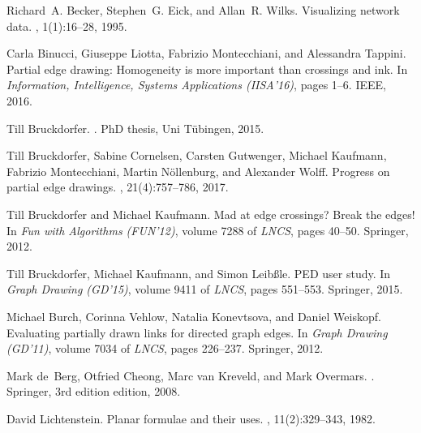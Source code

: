 \documentclass[a4paper,english,numberwithinsect]{eurocg18}
\begin{document}
%
\begin{thebibliography}{1}
	
	Richard~A. Becker, Stephen~G. Eick, and Allan~R. Wilks.
	\newblock Visualizing network data.
	, 1(1):16--28,
	1995.
	
	Carla Binucci, Giuseppe Liotta, Fabrizio Montecchiani, and Alessandra Tappini.
	\newblock Partial edge drawing: Homogeneity is more important than crossings
	and ink.
	\newblock In {\em Information, Intelligence, Systems Applications (IISA'16)},
	pages 1--6. IEEE, 2016.
	
	Till Bruckdorfer.
	.
	\newblock PhD thesis, Uni Tübingen, 2015.
	
	Till Bruckdorfer, Sabine Cornelsen, Carsten Gutwenger, Michael Kaufmann,
	Fabrizio Montecchiani, Martin Nöllenburg, and Alexander Wolff.
	\newblock Progress on partial edge drawings.
	, 21(4):757--786, 2017.
	
	Till Bruckdorfer and Michael Kaufmann.
	\newblock Mad at edge crossings? {Break} the edges!
	\newblock In {\em Fun with Algorithms (FUN'12)}, volume 7288 of {\em LNCS},
	pages 40--50. Springer, 2012.
	
	Till Bruckdorfer, Michael Kaufmann, and Simon Leibßle.
	\newblock PED user study.
	\newblock In {\em Graph Drawing (GD'15)}, volume 9411 of {\em LNCS}, pages
	551--553. Springer, 2015.
	
	Michael Burch, Corinna Vehlow, Natalia Konevtsova, and Daniel Weiskopf.
	\newblock Evaluating partially drawn links for directed graph edges.
	\newblock In {\em Graph Drawing (GD'11)}, volume 7034 of {\em LNCS}, pages
	226--237. Springer, 2012.
	
	Mark de~Berg, Otfried Cheong, Marc van Kreveld, and Mark Overmars.
	.
	\newblock Springer, 3rd edition edition, 2008.
	
	David Lichtenstein.
	\newblock Planar formulae and their uses.
	, 11(2):329--343, 1982.	
\end{thebibliography}
\end{document}
